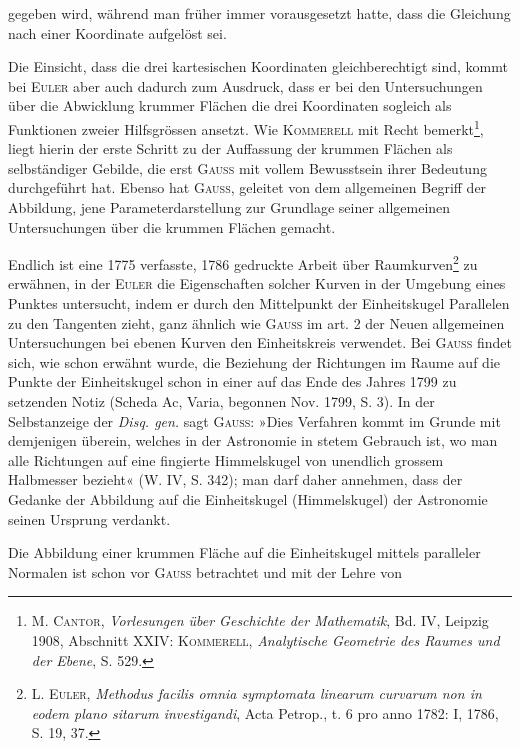 gegeben wird, während man früher immer vorausgesetzt hatte, dass die Gleichung
nach einer Koordinate aufgelöst sei.
\par
Die Einsicht, dass die drei kartesischen Koordinaten gleichberechtigt sind,
kommt bei \textsc{Euler} aber auch dadurch zum Ausdruck, dass er bei den Untersuchungen
über die Abwicklung krummer Flächen die drei Koordinaten sogleich
als Funktionen zweier Hilfsgrössen ansetzt. Wie \textsc{Kommerell} mit Recht
bemerkt\footnote{\textsc{M. Cantor}, \textit{Vorlesungen über Geschichte der Mathematik}, Bd. IV, Leipzig 1908, Abschnitt XXIV: \textsc{Kommerell}, \textit{Analytische Geometrie des Raumes und der Ebene}, S. 529.}, liegt hierin der erste Schritt zu der Auffassung der krummen
Flächen als selbständiger Gebilde, die erst \textsc{Gauss} mit vollem Bewusstsein
ihrer Bedeutung durchgeführt hat. Ebenso hat \textsc{Gauss}, geleitet von dem allgemeinen
Begriff der Abbildung, jene Parameterdarstellung zur Grundlage seiner
allgemeinen Untersuchungen über die krummen Flächen gemacht.
\par
Endlich ist eine 1775 verfasste, 1786 gedruckte Arbeit über Raumkurven\footnote{\textsc{L. Euler}, \textit{Methodus facilis omnia symptomata linearum curvarum non in eodem plano sitarum investigandi}, Acta Petrop., t. 6 pro anno 1782: I, 1786, S. 19, 37.}
zu erwähnen, in der \textsc{Euler} die Eigenschaften solcher Kurven in der Umgebung
eines Punktes untersucht, indem er durch den Mittelpunkt der Einheitskugel
Parallelen zu den Tangenten zieht, ganz ähnlich wie \textsc{Gauss} im art. 2 der
Neuen allgemeinen Untersuchungen bei ebenen Kurven den Einheitskreis verwendet.
Bei \textsc{Gauss} findet sich, wie schon erwähnt wurde, die Beziehung der
Richtungen im Raume auf die Punkte der Einheitskugel schon in einer auf
das Ende des Jahres 1799 zu setzenden Notiz (Scheda Ac, Varia, begonnen
Nov. 1799, S. 3). In der Selbstanzeige der \textit{Disq. gen.} sagt \textsc{Gauss}: »Dies Verfahren
kommt im Grunde mit demjenigen überein, welches in der Astronomie
in stetem Gebrauch ist, wo man alle Richtungen auf eine fingierte Himmelskugel
von unendlich grossem Halbmesser bezieht« (W. IV, S. 342); man darf
daher annehmen, dass der Gedanke der Abbildung auf die Einheitskugel
(Himmelskugel) der Astronomie seinen Ursprung verdankt.
\par
Die Abbildung einer krummen Fläche auf die Einheitskugel mittels
\clearpage{}\setcounter{footnote}{0}
\noindent paralleler Normalen ist schon vor \textsc{Gauss} betrachtet und mit der Lehre von
